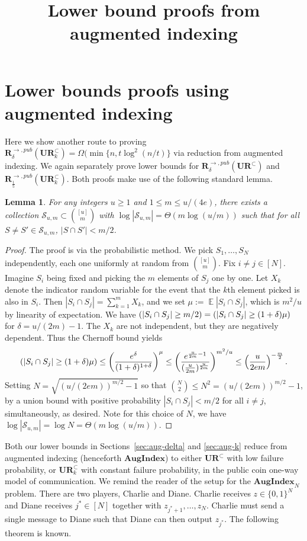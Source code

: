 \documentclass[11pt]{article}
\title{Lower bound proofs from augmented indexing}
\newtheorem{lemma}{Lemma}
\DeclareMathOperator*{\E}{\mathbb{E}}
\let\Pr\relax
\DeclareMathOperator*{\Pr}{\mathbb{P}}
\newcommand{\aug}{\mathbf{AugIndex}\xspace}
\newcommand{\ur}{\mathbf{UR}\xspace}
\newcommand{\randcom}{\mathbf{R}}
\begin{document}
\maketitle

\section{Lower bounds proofs using augmented indexing}

Here we show another route to proving $\randcom^{\rightarrow,pub}_\delta(\ur_k^\subset) = \Omega(\min\{n, t\log^2(n/t)\}$ via reduction from augmented indexing. We again separately prove lower bounds for $\randcom^{\rightarrow,pub}_\delta(\ur^\subset)$ and $\randcom^{\rightarrow,pub}_{\frac 15}(\ur_k^\subset)$. Both proofs make use of the following standard lemma.

\begin{lemma}\label{lem:code}
For any integers $u\ge 1$ and $1\le m\le u/(4e)$, there exists a collection $\mathcal S_{u,m} \subset \binom{[u]}m$ with $\log |\mathcal{S}_{u,m}| = \Theta(m\log(u/m))$ such that for all $S\neq S'\in \mathcal S_{u,m}$, $|S\cap S'| < m/2$.
\end{lemma}
\begin{proof}
The proof is via the probabilistic method. We pick $S_1,\ldots,S_N$ independently, each one uniformly at random from $\binom{[u]}m$. Fix $i\neq j\in[N]$. Imagine $S_i$ being fixed and picking the $m$ elements of $S_j$ one by one. Let $X_k$ denote the indicator random variable for the event that the $k$th element picked is also in $S_i$. Then $|S_i\cap S_j| = \sum_{k=1}^m X_k$, and we set $\mu:= \E |S_i\cap S_j|$, which is $m^2/u$ by linearity of expectation. We have $\Pr(|S_i \cap S_j| \ge m/2) = \Pr(|S_i\cap S_j| \ge (1+\delta)\mu)$ for $\delta = u/(2m) - 1$. The $X_k$ are not independent, but they are negatively dependent. Thus the Chernoff bound yields
$$
\Pr(|S_i\cap S_j| \ge (1+\delta)\mu) \le \left(\frac{e^{\delta}}{(1+\delta)^{1+\delta}}\right)^\mu \le \left(\frac{e^{\frac u{2m} - 1}}{(\frac u{2m})^{\frac u{2m}}}\right)^{m^2/u} \le \left(\frac u{2em}\right)^{-\frac m2} .
$$
Setting $N = \sqrt{(u/(2em))^{m/2} - 1}$ so that ${N \choose 2}\leq N^2=(u/(2em))^{m/2} - 1$, by a union bound with positive probability $|S_i\cap S_j| < m/2$ for all $i\neq j$, simultaneously, as desired. Note for this choice of $N$, we have $\log|\mathcal S_{u,m}| = \log N = \Theta(m\log(u/m))$.
\end{proof}

Both our lower bounds in Sections~\ref{sec:aug-delta} and \ref{sec:aug-k} reduce from augmented indexing (henceforth $\aug$) to either $\ur^\subset$ with low failure probability, or $\ur_k^\subset$ with constant failure probability, in the public coin one-way model of communication. We remind the reader of the setup for the $\aug_N$ problem. There are two players, Charlie and Diane. Charlie receives $z\in\{0,1\}^N$ and Diane receives $j^*\in[N]$ together with $z_{j^*+1},\ldots,z_N$. Charlie must send a single message to Diane such that Diane can then output $z_{j^*}$. The following theorem is known.
\end{document}
